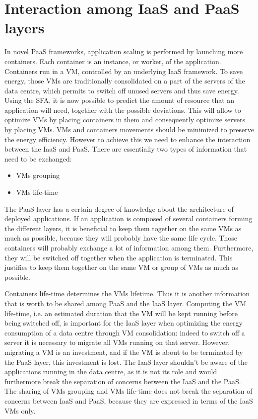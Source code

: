 
\section{Interaction among IaaS and PaaS layers}
\label{sec:iaaspaas}

In novel PaaS frameworks, application scaling is performed by launching more containers.
Each container is an instance, or worker, of the application.
Containers run in a VM, controlled by an underlying IaaS framework.
To save energy, those VMs are traditionally consolidated on a part of the servers of the data centre, which permits to switch off unused servers and thus save energy.
Using the SFA, it is now possible to predict the amount of resource that an application will need, together with the possible deviations.
This will allow to optimize VMs by placing containers in them and consequently optimize servers by placing VMs.
VMs and containers movements should be minimized to preserve the energy efficiency.
However to achieve this we need to enhance the interaction between the IaaS and PaaS.
There are essentially two types of information that need to be exchanged:
\begin{itemize}
  \item VMs grouping
  \item VMs life-time
\end{itemize}

The PaaS layer has a certain degree of knowledge about the architecture of deployed applications.
If an application is composed of several containers forming the different layers, it is beneficial to keep them together on the same VMs as much as possible, because they will probably have the same life cycle.
Those containers will probably exchange a lot of information among them.
Furthermore, they will be switched off together when the application is terminated.
This justifies to keep them together on the same VM or group of VMs as much as possible.

Containers life-time determines the VMs lifetime. Thus it is another information that is worth to be shared among PaaS and the IaaS layer.
Computing the VM life-time, i.e. an estimated duration that the VM will be kept running before being switched off, is important for the IaaS layer when optimizing the energy consumption of a data centre through VM consolidation: indeed to switch off a server it is necessary to migrate all VMs running on that server.
However, migrating a VM is an investment, and if the VM is about to be terminated by the PaaS layer, this investment is lost.
The IaaS layer shouldn't be aware of the applications running in the data centre, as it is not its role and would furthermore break the separation of concerns between the IaaS and the PaaS.
The sharing of VMs grouping and VMs life-time does not break the separation of concerns between IaaS and PaaS, because they are expressed in terms of the IaaS VMs only.

